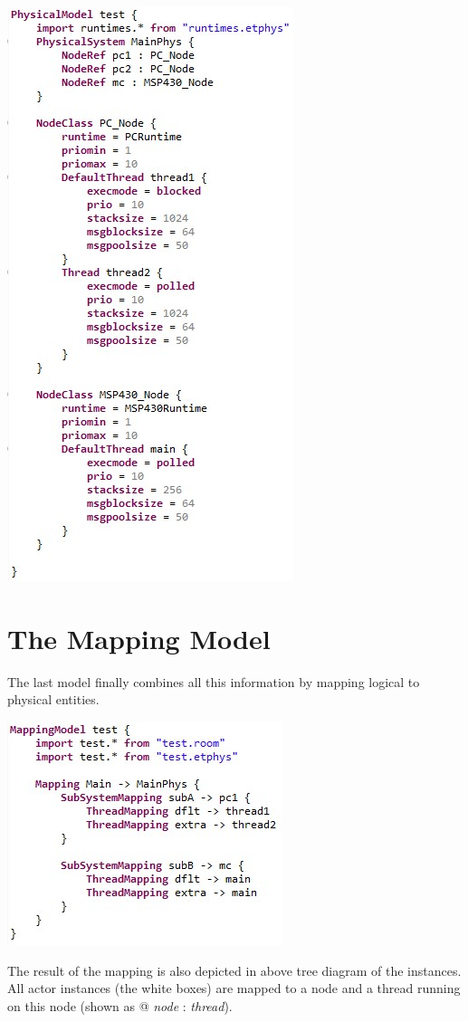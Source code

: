 \includegraphics{images/080-phys.jpg}

\section{The Mapping Model}

The last model finally combines all this information by mapping logical to physical entities.

\includegraphics{images/080-map.jpg}

The result of the mapping is also depicted in above tree diagram of the instances. All actor instances (the white boxes) are mapped to a node and a thread running on this node (shown as @ \textit{node} : \textit{thread}).
